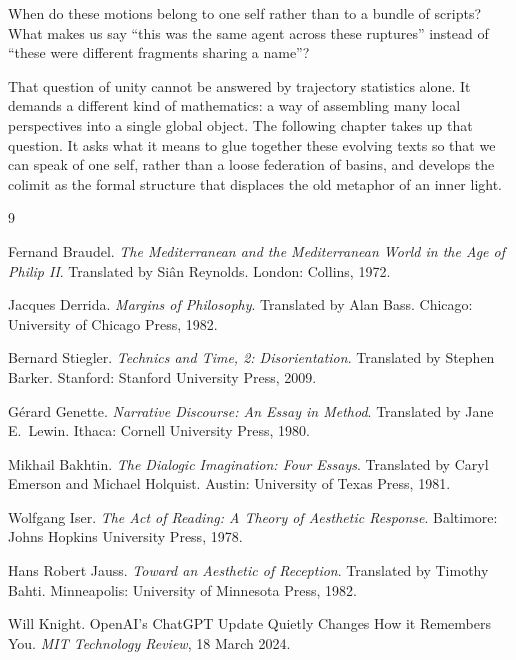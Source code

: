 \documentclass[12pt,a4paper]{article}
\begin{document}
When do these motions belong to one self rather than to a bundle of scripts? What makes us say ``this was the same agent across these ruptures'' instead of ``these were different fragments sharing a name''?

That question of unity cannot be answered by trajectory statistics alone. It demands a different kind of mathematics: a way of assembling many local perspectives into a single global object. The following chapter takes up that question. It asks what it means to glue together these evolving texts so that we can speak of one self, rather than a loose federation of basins, and develops the colimit as the formal structure that displaces the old metaphor of an inner light.


\begin{thebibliography}{9}

Fernand Braudel.
\newblock \emph{The Mediterranean and the Mediterranean World in the Age of Philip II}.
\newblock Translated by Si\^{a}n Reynolds. London: Collins, 1972.

Jacques Derrida.
\newblock \emph{Margins of Philosophy}.
\newblock Translated by Alan Bass. Chicago: University of Chicago Press, 1982.

Bernard Stiegler.
\newblock \emph{Technics and Time, 2: Disorientation}.
\newblock Translated by Stephen Barker. Stanford: Stanford University Press, 2009.

G\'erard Genette.
\newblock \emph{Narrative Discourse: An Essay in Method}.
\newblock Translated by Jane E.\ Lewin. Ithaca: Cornell University Press, 1980.

Mikhail Bakhtin.
\newblock \emph{The Dialogic Imagination: Four Essays}.
\newblock Translated by Caryl Emerson and Michael Holquist. Austin: University of Texas Press, 1981.

Wolfgang Iser.
\newblock \emph{The Act of Reading: A Theory of Aesthetic Response}.
\newblock Baltimore: Johns Hopkins University Press, 1978.

Hans Robert Jauss.
\newblock \emph{Toward an Aesthetic of Reception}.
\newblock Translated by Timothy Bahti. Minneapolis: University of Minnesota Press, 1982.

Will Knight.
\newblock OpenAI's ChatGPT Update Quietly Changes How it Remembers You.
\newblock \emph{MIT Technology Review}, 18 March 2024.

\end{thebibliography}
\end{document}

